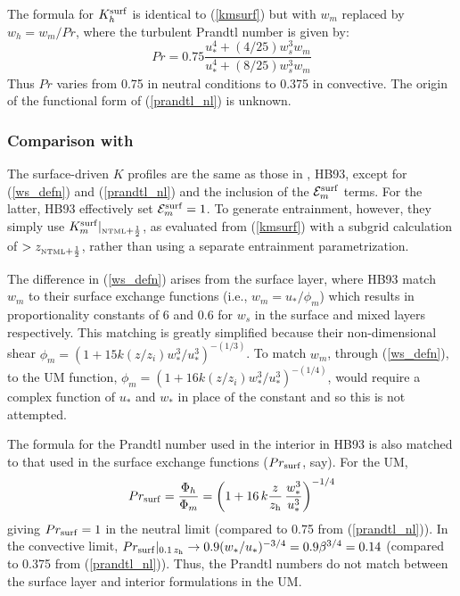 \documentclass{UMDP_article}
\begin{document}
The formula for $K_h^{\rm surf}$ is identical to (\ref{kmsurf}) but with
$w_m$ replaced by $w_h=w_m/Pr$, where the turbulent Prandtl number is
given by:
\begin{equation}
  Pr = 0.75 \frac{u_*^4 + (4/25)w_s^3 w_m}{u_*^4 + (8/25)w_s^3 w_m}
  \label{prandtl_nl}
\end{equation}
Thus $Pr$ varies from 0.75 in neutral conditions to 0.375 in
convective.  The origin of the functional form of (\ref{prandtl_nl})
is unknown.

\subsubsection[Comparison with Holtslag and Boville (1993)]{Comparison with 
  \cite{holtslag93:_local_versus_nonloc_bound_layer}}
\label{sec:hbcomp}
The surface-driven $K$ profiles are the same as those in
\cite{holtslag93:_local_versus_nonloc_bound_layer}, HB93, except for
(\ref{ws_defn}) and (\ref{prandtl_nl}) and the inclusion of the ${\cal
  E}_m^{\rm surf}$ terms.  For the latter, HB93 effectively set ${\cal
  E}_m^{\rm surf} =1$.  To generate entrainment, however, they simply
use $K_m^{\rm surf}|_{\mbox{\tiny \rm NTML}+\frac{1}{2}}$, as evaluated from (\ref{kmsurf})
with a subgrid calculation of \zh$>z_{\mbox{\tiny \rm NTML}+\frac{1}{2}}$, rather than
using a separate entrainment parametrization.

The difference in (\ref{ws_defn}) arises from the surface layer, where
HB93 match $w_m$ to their surface exchange functions (\mbox{i.e.},
$w_m = u_* / \phi_m $) which results in proportionality constants of 6
and 0.6 for $w_s$ in the surface and mixed layers respectively.  This
matching is greatly simplified because their non-dimensional shear
$\phi_m = ( 1 + 15 k (z/z_i) w_*^3 / u_*^3 )^{-(1/3)}$.  To match
$w_m$, through (\ref{ws_defn}), to the UM function, $\phi_m = ( 1 + 16
k (z/z_i) w_*^3 / u_*^3 )^{-(1/4)}$, would require a complex function
of $u_*$ and $w_*$ in place of the constant and so this is not
attempted.

The formula for the Prandtl number used in the interior in HB93 is
also matched to that used in the surface exchange functions ($Pr_{\rm
  surf}$, say).  For the UM,
\begin{equation*}
  Pr_{\rm surf} = \frac{\Phi_h}{\Phi_m} 
             = \left( 1 + 16 \, k \frac{z}{z_{\rm h}} \, \frac{w_*^3}{u_*^3}
               \right)^{-1/4}
\end{equation*}
giving $Pr_{\rm surf} = 1$ in the neutral limit (compared to 0.75 from
(\ref{prandtl_nl})).  In the convective limit, $Pr_{\rm surf}|_{0.1\,
  z_{\rm h}} \rightarrow 0.9 (w_*/u_*)^{-3/4} = 0.9 \beta^{3/4} = 0.14 $
(compared to 0.375 from (\ref{prandtl_nl})).  Thus, the Prandtl
numbers do not match between the surface layer and interior
formulations in the UM.
\end{document}
